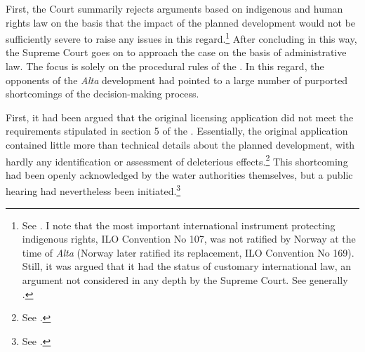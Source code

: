 
First, the Court summarily rejects arguments based on indigenous and human rights law on the basis that the impact of the planned development would not be sufficiently severe to raise any issues in this regard.\footnote{See \cite[351-352]{eckhoff82}. I note that the most important international instrument protecting indigenous rights, ILO Convention No 107, was not ratified by Norway at the time of {\it Alta} (Norway later ratified its replacement, ILO Convention No 169). Still, it was argued that it had the status of customary international law, an argument not considered in any depth by the Supreme Court. See generally \cite{eide80}.} After concluding in this way, the Supreme Court goes on to approach the case on the basis of administrative law. The focus is solely on the procedural rules of the \cite{wra17}. In this regard, the opponents of the {\it Alta} development had pointed to a large number of purported shortcomings of the decision-making process. 

First, it had been argued that the original licensing application did not meet the requirements stipulated in section 5 of the \cite{wra17}. Essentially, the original application contained little more than technical details about the planned development, with hardly any identification or assessment of deleterious effects.\footnote{See \cite[264-265]{alta82}.} This shortcoming had been openly acknowledged by the water authorities themselves, but a public hearing had nevertheless been initiated.\footnote{See \cite[265]{alta82}.}

